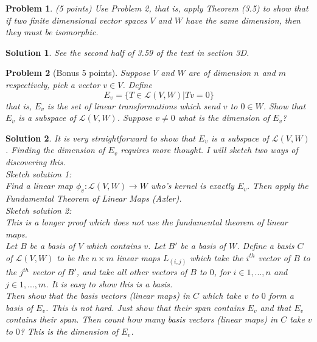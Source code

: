 \documentclass{article}
\theoremstyle{problemstyle}
\newtheorem{problem}{Problem}
\theoremstyle{problemstyle}
\newtheorem{solution}{Solution}
\theoremstyle{problemstyle}
\begin{document}
\begin{problem}
(5 points) Use Problem 2, that is, apply Theorem (3.5) to show that if two finite dimensional vector spaces $V$ and $W$ have the same dimension, then they must be isomorphic. 
\end{problem}

\begin{solution}
See the second half of 3.59 of the text in section 3D. 
\end{solution}

\begin{problem}[Bonus 5 points]
Suppose $V$ and $W$ are of dimension $n$ and $m$ respectively, pick a vector $v\in V$. Define $$E_v = \{T \in \mathscr{L}(V,W)|Tv = 0\}$$ that is, $E_v$ is the set of linear transformations which send $v$ to $0 \in W$. Show that $E_v$ is a subspace of $\mathscr{L}(V,W)$. Suppose $v \neq 0$ what is the dimension of $E_v$? 
\end{problem}

\begin{solution}
It is very straightforward to show that $E_v$ is a subspace of $\mathscr{L}(V,W)$. Finding the dimension of $E_v$ requires more thought. I will sketch two ways of discovering this.\\ 

Sketch solution 1:\\

Find a linear map $\phi_v:\mathscr{L}(V,W) \rightarrow W$ who's kernel is exactly $E_v$. Then apply the Fundamental Theorem of Linear Maps (Axler).\\ 

Sketch solution 2:\\

This is a longer proof which does not use the fundamental theorem of linear maps.\\ 

Let $B$ be a basis of $V$ which contains $v$. Let $B'$ be a basis of $W$. Define a basis $C$ of $\mathscr{L}(V,W)$ to be the $n \times m$ linear maps $L_{(i,j)}$ which take the $i^{th}$ vector of $B$ to the $j^{th}$ vector of $B'$, and take all other vectors of $B$ to $0$, for $i \in 1,...,n$ and $j \in 1,...,m$. It is easy to show this is a basis.\\ 

Then show that the basis vectors (linear maps) in $C$ which take $v$ to $0$ form a basis of $E_v$. This is not hard. Just show that their span contains $E_v$ and that $E_v$ contains their span. Then count how many basis vectors (linear maps) in $C$ take $v$ to $0$? This is the dimension of $E_v$.  

\end{solution}
\end{document}

